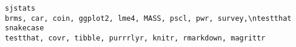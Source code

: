 \documentclass[
  letterpaper,
  DIV=11,
  numbers=noendperiod]{scrreprt}
\begin{document}
\begin{verbatim}
sjstats                                                                                                                                                                                                                                                                                                                                                                                                                                                                                                                                                                                                                                                                                                                                                                                                                                                                                                                                                                                                                                                                                                                                                                                                                                    brms, car, coin, ggplot2, lme4, MASS, pscl, pwr, survey,\ntestthat
snakecase                                                                                                                                                                                                                                                                                                                                                                                                                                                                                                                                                                                                                                                                                                                                                                                                                                                                                                                                                                                                                                                                                                                                                                                                                                        testthat, covr, tibble, purrrlyr, knitr, rmarkdown, magrittr

\end{verbatim}
\end{document}
